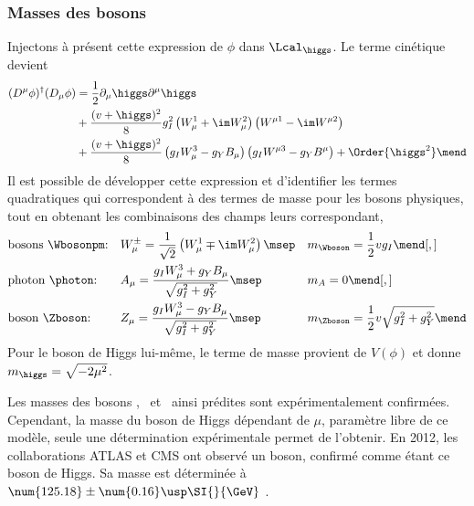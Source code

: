 \subsubsection{Masses des bosons}\label{chapter-MS-MSSM-section-formalisme-subsec-Higgs_mechanism-subsubsec-bosons}
Injectons à présent cette expression de $\phi$ dans $\Lcal_{\higgs}$. Le terme cinétique devient
\begin{align}
(D^\mu\phi)^\dagger(D_\mu\phi)
&
=
\frac{1}{2}\partial_\mu \higgs \partial^\mu \higgs
\nonumber\\&
+
\frac{(v+\higgs)^2}{8} g_I^2 \left(W_\mu^1 + \im W_\mu^2\right) \left( W^{\mu1}-\im W^{\mu2}\right)
\nonumber\\&
+
\frac{(v+\higgs)^2}{8} \left(g_I W_\mu^3 - g_Y B_\mu \right) \left( g_I W^{\mu3}-g_Y B^\mu \vphantom{W^{\mu1}}\right)
+ \Order{\higgs^2}
\mend
\end{align}
Il est possible de développer cette expression et d'identifier les termes quadratiques qui correspondent à des termes de masse pour les bosons physiques, tout en obtenant les combinaisons des champs leurs correspondant,
\begin{align}
&
\text{bosons \Wbosonpm:}
&&
W_\mu^\pm = \frac{1}{\sqrt{2}} \left( W_\mu^1 \mp \im W_\mu^2 \right)
\msep&&
m_{\Wboson} = \frac{1}{2} v g_I
\mend[,]
\\
&
\text{photon \photon:}
&&
A_\mu = \frac{g_I W_\mu^3 + g_Y B_\mu}{\sqrt{g_I^2 + g_Y^2}}
\msep&&
m_A = 0
\mend[,]
\\
&
\text{boson \Zboson:}
&&
Z_\mu = \frac{g_I W_\mu^3 - g_Y B_\mu}{\sqrt{g_I^2 + g_Y^2}}
\msep&&
m_{\Zboson} = \frac{1}{2} v \sqrt{g_I^2 + g_Y^2}
\mend
\end{align}
Pour le boson de Higgs lui-même, le terme de masse provient de $V(\phi)$ et donne $m_{\higgs} = \sqrt{-2\mu^2}$.
\par Les masses des bosons \Wbosonpm, \photon\ et \Zboson\ ainsi prédites sont expérimentalement confirmées.
Cependant, la masse du boson de Higgs dépendant de $\mu$, paramètre libre de ce modèle, seule une détermination expérimentale permet de l'obtenir. En 2012, les collaborations ATLAS et CMS ont observé un boson, confirmé comme étant ce boson de Higgs. Sa masse est déterminée à $\num{125.18}\pm\num{0.16}\usp\SI{}{\GeV}$ .

